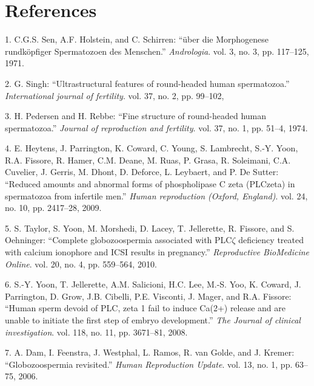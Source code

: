 \documentclass[12pt,twoside]{reedthesis}
\theoremstyle{definition}
\theoremstyle{definition}
\theoremstyle{remark}
\begin{document}
  \chapter*{References}\label{references}
  
  \hypertarget{refs}{}
  \hypertarget{ref-Sen2009}{}
  1. C.G.S. Sen, A.F. Holstein, and C. Schirren: ``über die Morphogenese
  rundköpfiger Spermatozoen des Menschen.'' \emph{Andrologia}. vol. 3, no.
  3, pp. 117--125, 1971.
  
  \hypertarget{ref-Singh}{}
  2. G. Singh: ``Ultrastructural features of round-headed human
  spermatozoa.'' \emph{International journal of fertility}. vol. 37, no.
  2, pp. 99--102,
  
  \hypertarget{ref-Pedersen1974}{}
  3. H. Pedersen and H. Rebbe: ``Fine structure of round-headed human
  spermatozoa.'' \emph{Journal of reproduction and fertility}. vol. 37,
  no. 1, pp. 51--4, 1974.
  
  \hypertarget{ref-Heytens2009}{}
  4. E. Heytens, J. Parrington, K. Coward, C. Young, S. Lambrecht, S.-Y.
  Yoon, R.A. Fissore, R. Hamer, C.M. Deane, M. Ruas, P. Grasa, R.
  Soleimani, C.A. Cuvelier, J. Gerris, M. Dhont, D. Deforce, L. Leybaert,
  and P. De Sutter: ``Reduced amounts and abnormal forms of phospholipase
  C zeta (PLCzeta) in spermatozoa from infertile men.'' \emph{Human
  reproduction (Oxford, England)}. vol. 24, no. 10, pp. 2417--28, 2009.
  
  \hypertarget{ref-Taylor2010}{}
  5. S. Taylor, S. Yoon, M. Morshedi, D. Lacey, T. Jellerette, R. Fissore,
  and S. Oehninger: ``Complete globozoospermia associated with
  PLC\(\zeta\) deficiency treated with calcium ionophore and ICSI results
  in pregnancy.'' \emph{Reproductive BioMedicine Online}. vol. 20, no. 4,
  pp. 559--564, 2010.
  
  \hypertarget{ref-Yoon2008}{}
  6. S.-Y. Yoon, T. Jellerette, A.M. Salicioni, H.C. Lee, M.-S. Yoo, K.
  Coward, J. Parrington, D. Grow, J.B. Cibelli, P.E. Visconti, J. Mager,
  and R.A. Fissore: ``Human sperm devoid of PLC, zeta 1 fail to induce
  Ca(2+) release and are unable to initiate the first step of embryo
  development.'' \emph{The Journal of clinical investigation}. vol. 118,
  no. 11, pp. 3671--81, 2008.
  
  \hypertarget{ref-Dam2006}{}
  7. A. Dam, I. Feenstra, J. Westphal, L. Ramos, R. van Golde, and J.
  Kremer: ``Globozoospermia revisited.'' \emph{Human Reproduction Update}.
  vol. 13, no. 1, pp. 63--75, 2006.
  
\end{document}
